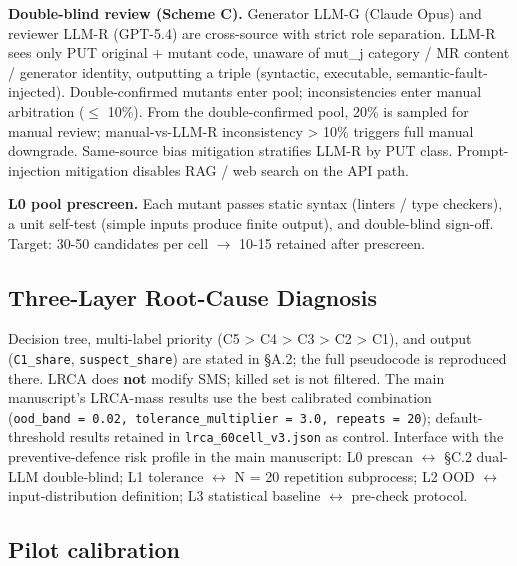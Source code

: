 \documentclass[manuscript,screen,review]{acmart}
\begin{document}
\textbf{Double-blind review (Scheme C).} Generator LLM-G (Claude Opus)
and reviewer LLM-R (GPT-5.4) are cross-source with strict role
separation. LLM-R sees only PUT original + mutant code, unaware of
mut\_j category / MR content / generator identity, outputting a triple
(syntactic, executable, semantic-fault-injected). Double-confirmed
mutants enter pool; inconsistencies enter manual arbitration ($\leq$ 10\%).
From the double-confirmed pool, 20\% is sampled for manual review;
manual-vs-LLM-R inconsistency \textgreater{} 10\% triggers full manual
downgrade. Same-source bias mitigation stratifies LLM-R by PUT class.
Prompt-injection mitigation disables RAG / web search on the API path.

\textbf{L0 pool prescreen.} Each mutant passes static syntax (linters /
type checkers), a unit self-test (simple inputs produce finite output),
and double-blind sign-off. Target: 30-50 candidates per cell $\to$ 10-15
retained after prescreen.

\subsection{Three-Layer Root-Cause Diagnosis}\label{c.4-lrca-three-layer-execution-full}

Decision tree, multi-label priority (C5 \textgreater{} C4 \textgreater{}
C3 \textgreater{} C2 \textgreater{} C1), and output (\texttt{C1\_share},
\texttt{suspect\_share}) are stated in §A.2; the full pseudocode is
reproduced there. LRCA does \textbf{not} modify SMS; killed set is not
filtered. The main manuscript's LRCA-mass results use the best calibrated combination
(\texttt{ood\_band\ =\ 0.02,\ tolerance\_multiplier\ =\ 3.0,\ repeats\ =\ 20});
default-threshold results retained in \texttt{lrca\_60cell\_v3.json} as
control. Interface with the preventive-defence risk profile in the main manuscript: L0 prescan $\leftrightarrow$ §C.2 dual-LLM
double-blind; L1 tolerance $\leftrightarrow$ N = 20 repetition subprocess; L2 OOD $\leftrightarrow$
input-distribution definition; L3 statistical baseline $\leftrightarrow$ pre-check
protocol.

\subsection{Pilot calibration}\label{c.4.1-pilot-calibration-37-operators-k-1020}
\end{document}
